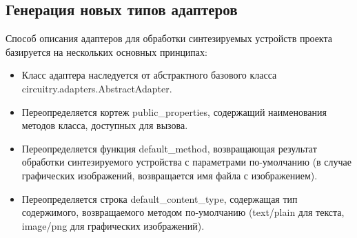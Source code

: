 \documentclass[document.tex]{subfiles}
\begin{document}
\clearpage\subsection{Генерация новых типов адаптеров}
Способ описания адаптеров для обработки синтезируемых устройств проекта
базируется на нескольких основных принципах:
\begin{itemize}[noitemsep]
  \item Класс адаптера наследуется от абстрактного базового класса
  circuitry.adapters.AbstractAdapter.
  \item Переопределяется кортеж public{\_}properties, содержащий
  наименования методов класса, доступных для вызова.
  \item Переопределяется функция default{\_}method, возвращающая результат
  обработки синтезируемого устройства с параметрами по-умолчанию (в случае
  графических изображений, возвращается имя файла с изображением).
  \item Переопределяется строка default{\_}content{\_}type, содержащая тип
  содержимого, возвращаемого методом по-умолчанию (text/plain для текста,
  image/png для графических изображений).
\end{itemize}
\end{document}
